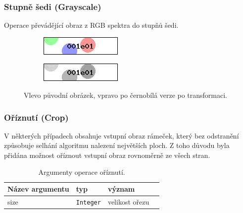 \documentclass[
  field=ainfp,
  master=true,
  biblatex,
  sourcecodes=false,
  theorems=false,
  glossaries,
  index
]{kidiplom}
\begin{document}
\subsubsection*{Stupně šedi (Grayscale)}
Operace převádějící obraz z RGB spektra do stupňů šedi.
\begin{figure}[H]
\centering
\begin{subfigure}{.5\textwidth}
  \centering
  \includegraphics[width=.8\linewidth]{images/grayscale_original.jpg}
\end{subfigure}%
\begin{subfigure}{.5\textwidth}
  \centering
  \includegraphics[width=.8\linewidth]{images/grayscale_result.png}
\end{subfigure}
\caption{Vlevo původní obrázek, vpravo po černobílá verze po transformaci.}
\label{fig:crop_example}
\end{figure}

\subsubsection*{Oříznutí (Crop)}
V některých případech obsahuje vstupní obraz rámeček, který bez odstranění způsobuje selhání algoritmu nalezení největších ploch. Z toho důvodu byla při\-dána možnost oříznout vstupní obraz rovnoměrně ze všech stran.

\begin{table}[H]
\centering
\begin{tabular}{|l|l|l|l|}
\hline
\textbf{Název argumentu} & \textbf{typ} & \textbf{význam}
\\ \hline
size & \texttt{Integer} & velikost ořezu
\\ \hline
\end{tabular}
\caption{Argumenty operace oříznutí.}
\end{table}
\end{document}
